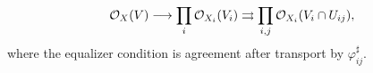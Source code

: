 \[\mathcal O_X(V)\longrightarrow\prod_i\mathcal O_{X_i}(V_i)\rightrightarrows\prod_{i,j}\mathcal O_{X_i}(V_i\cap U_{ij}),\] 
where the equalizer condition is agreement after transport by $\varphi_{ij}^{\sharp}$.
